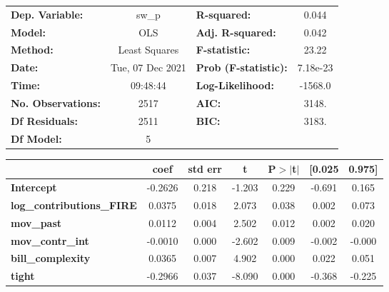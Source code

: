 \begin{center}
\begin{tabular}{lclc}
\toprule
\textbf{Dep. Variable:}           &      sw\_p       & \textbf{  R-squared:         } &     0.044   \\
\textbf{Model:}                   &       OLS        & \textbf{  Adj. R-squared:    } &     0.042   \\
\textbf{Method:}                  &  Least Squares   & \textbf{  F-statistic:       } &     23.22   \\
\textbf{Date:}                    & Tue, 07 Dec 2021 & \textbf{  Prob (F-statistic):} &  7.18e-23   \\
\textbf{Time:}                    &     09:48:44     & \textbf{  Log-Likelihood:    } &   -1568.0   \\
\textbf{No. Observations:}        &        2517      & \textbf{  AIC:               } &     3148.   \\
\textbf{Df Residuals:}            &        2511      & \textbf{  BIC:               } &     3183.   \\
\textbf{Df Model:}                &           5      & \textbf{                     } &             \\
\bottomrule
\end{tabular}
\begin{tabular}{lcccccc}
                                  & \textbf{coef} & \textbf{std err} & \textbf{t} & \textbf{P$> |$t$|$} & \textbf{[0.025} & \textbf{0.975]}  \\
\midrule
\textbf{Intercept}                &      -0.2626  &        0.218     &    -1.203  &         0.229        &       -0.691    &        0.165     \\
\textbf{log\_contributions\_FIRE} &       0.0375  &        0.018     &     2.073  &         0.038        &        0.002    &        0.073     \\
\textbf{mov\_past}                &       0.0112  &        0.004     &     2.502  &         0.012        &        0.002    &        0.020     \\
\textbf{mov\_contr\_int}          &      -0.0010  &        0.000     &    -2.602  &         0.009        &       -0.002    &       -0.000     \\
\textbf{bill\_complexity}         &       0.0365  &        0.007     &     4.902  &         0.000        &        0.022    &        0.051     \\
\textbf{tight}                    &      -0.2966  &        0.037     &    -8.090  &         0.000        &       -0.368    &       -0.225     \\

\end{tabular}
\end{center}

